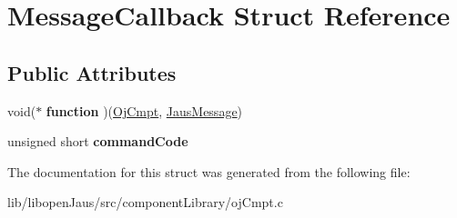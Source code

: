 \hypertarget{struct_message_callback}{\section{\-Message\-Callback \-Struct \-Reference}
\label{struct_message_callback}
}
\subsection*{\-Public \-Attributes}
\begin{DoxyCompactItemize}
\item 
\hypertarget{struct_message_callback_aad236f45dd77417f9f45e0e2a90fc072}{void($\ast$ {\bfseries function} )(\hyperlink{struct_oj_cmpt_struct}{\-Oj\-Cmpt}, \hyperlink{struct_jaus_message_struct}{\-Jaus\-Message})}\label{struct_message_callback_aad236f45dd77417f9f45e0e2a90fc072}

\item 
\hypertarget{struct_message_callback_a14b1db4c5c87915bfa85dbf9ea7ae819}{unsigned short {\bfseries command\-Code}}\label{struct_message_callback_a14b1db4c5c87915bfa85dbf9ea7ae819}

\end{DoxyCompactItemize}


\-The documentation for this struct was generated from the following file\-:\begin{DoxyCompactItemize}
\item 
lib/libopen\-Jaus/src/component\-Library/oj\-Cmpt.\-c\end{DoxyCompactItemize}
